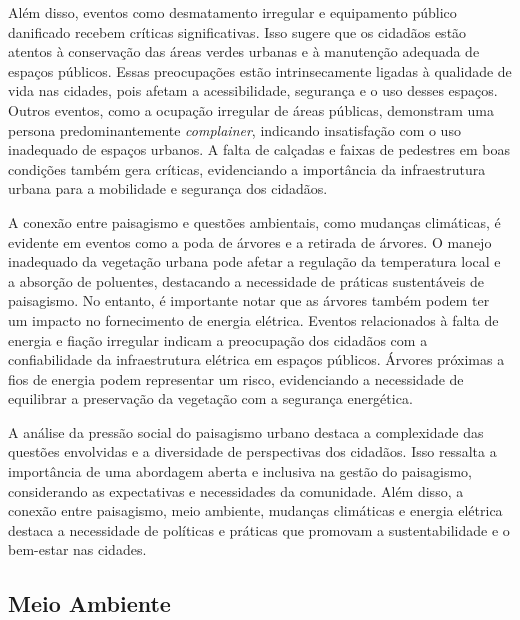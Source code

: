 Além disso, eventos como desmatamento irregular e equipamento público danificado recebem críticas significativas. Isso sugere que os cidadãos estão atentos à conservação das áreas verdes urbanas e à manutenção adequada de espaços públicos. Essas preocupações estão intrinsecamente ligadas à qualidade de vida nas cidades, pois afetam a acessibilidade, segurança e o uso desses espaços. Outros eventos, como a ocupação irregular de áreas públicas, demonstram uma persona predominantemente \textit{complainer}, indicando insatisfação com o uso inadequado de espaços urbanos. A falta de calçadas e faixas de pedestres em boas condições também gera críticas, evidenciando a importância da infraestrutura urbana para a mobilidade e segurança dos cidadãos.

A conexão entre paisagismo e questões ambientais, como mudanças climáticas, é evidente em eventos como a poda de árvores e a retirada de árvores. O manejo inadequado da vegetação urbana pode afetar a regulação da temperatura local e a absorção de poluentes, destacando a necessidade de práticas sustentáveis de paisagismo. No entanto, é importante notar que as árvores também podem ter um impacto no fornecimento de energia elétrica. Eventos relacionados à falta de energia e fiação irregular indicam a preocupação dos cidadãos com a confiabilidade da infraestrutura elétrica em espaços públicos. Árvores próximas a fios de energia podem representar um risco, evidenciando a necessidade de equilibrar a preservação da vegetação com a segurança energética.

A análise da pressão social do paisagismo urbano destaca a complexidade das questões envolvidas e a diversidade de perspectivas dos cidadãos. Isso ressalta a importância de uma abordagem aberta e inclusiva na gestão do paisagismo, considerando as expectativas e necessidades da comunidade. Além disso, a conexão entre paisagismo, meio ambiente, mudanças climáticas e energia elétrica destaca a necessidade de políticas e práticas que promovam a sustentabilidade e o bem-estar nas cidades.

\subsection{Meio Ambiente}
\label{sec:eventos_populares_environment}

